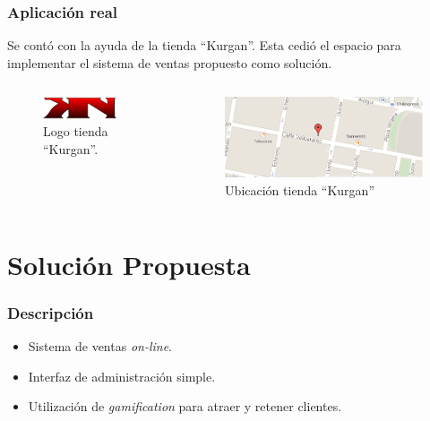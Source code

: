 \documentclass[10pt, compress]{beamer}
\begin{document}
\begin{frame}
 \frametitle{Aplicación real}

Se contó con la ayuda de la tienda ``Kurgan''. Esta cedió el espacio para implementar el sistema de ventas 
propuesto como solución.

\begin{columns}[onlytextwidth]
\begin{figure}
\centering
    \includegraphics[width=0.8\textwidth]{images/logo.png}
    \caption{Logo tienda ``Kurgan''.}
    \label{fig:awesome_image}
\end{figure}

\begin{figure}
\centering
    \includegraphics[width=1.0\textwidth]{images/mapa.png}
    \caption{Ubicación tienda ``Kurgan''}
    \label{fig:awesome_image}
\end{figure}

\end{columns}
\end{frame}

\section{Solución Propuesta}

\begin{frame}
 \frametitle{Descripción}

\begin{itemize}
 \item Sistema de ventas \emph{on-line}.
 \item Interfaz de administración simple.
 \item Utilización de \emph{gamification} para atraer y retener clientes.
\end{itemize}
\end{frame}
\end{document}
